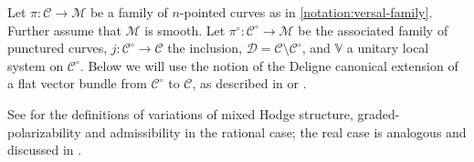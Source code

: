 \documentclass[12 pt]{amsart}
\theoremstyle{plain}
\theoremstyle{definition}
\theoremstyle{remark}
\numberwithin{equation}{section}
\begin{document}
Let $\pi: \mathscr{C} \to \mathscr{M}$ be a family of $n$-pointed curves as in
\autoref{notation:versal-family}. 
Further assume that $\mathscr{M}$ is smooth. 
Let $\pi^\circ: \mathscr{C}^\circ\to
\mathscr{M}$ be the associated family of punctured curves, 
$j : \mathscr C^\circ \to \mathscr C$ the inclusion, 
$\mathscr{D}=\mathscr{C}\setminus\mathscr{C}^\circ$,
and $\mathbb V$ a unitary local system on $\mathscr C^\circ$.
Below we will use the notion of the Deligne canonical extension of a flat vector bundle from $\mathscr C^\circ$
to $\mathscr C$, as described in
\cite[Remarques 5.5(i)]{deligne:regular-singular} or \cite[Definition
4.1.2]{LL:geometric-local-systems}. 

See \cite[Definitions 14.44, 14.45, and 14.49]{peters2008mixed} for the definitions of variations of mixed Hodge structure, graded-polarizability
and 
admissibility in the rational case; the real case is analogous and discussed in \cite[Definition 3.4]{steenbrink1985variation}.
\end{document}
